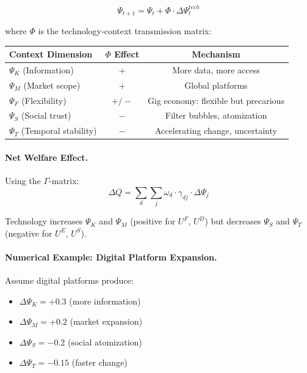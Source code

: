 \begin{equation}
\Psi_{t+1} = \Psi_t + \Phi \cdot \Delta \Psi^{tech}_t
\end{equation}

where $\Phi$ is the technology-context transmission matrix:

\begin{center}
\renewcommand{\arraystretch}{1.2}
\begin{tabular}{lcc}
\hline
\textbf{Context Dimension} & \textbf{$\Phi$ Effect} & \textbf{Mechanism} \\
\hline
$\Psi_K$ (Information) & $+$ & More data, more access \\
$\Psi_M$ (Market scope) & $+$ & Global platforms \\
$\Psi_F$ (Flexibility) & $+/-$ & Gig economy: flexible but precarious \\
$\Psi_S$ (Social trust) & $-$ & Filter bubbles, atomization \\
$\Psi_T$ (Temporal stability) & $-$ & Accelerating change, uncertainty \\
\hline
\end{tabular}
\end{center}

\paragraph{Net Welfare Effect.}
Using the $\Gamma$-matrix:
\begin{equation}
\Delta Q = \sum_{d} \sum_{j} \omega_d \cdot \gamma_{dj} \cdot \Delta \Psi_j
\end{equation}

Technology increases $\Psi_K$ and $\Psi_M$ (positive for $U^F$, $U^D$) 
but decreases $\Psi_S$ and $\Psi_T$ (negative for $U^E$, $U^S$).

\paragraph{Numerical Example: Digital Platform Expansion.}

Assume digital platforms produce:
\begin{itemize}
  \item $\Delta \Psi_K = +0.3$ (more information)
  \item $\Delta \Psi_M = +0.2$ (market expansion)
  \item $\Delta \Psi_S = -0.2$ (social atomization)
  \item $\Delta \Psi_T = -0.15$ (faster change)
\end{itemize}

